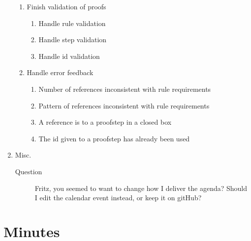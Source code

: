 \documentclass[a4paper]{article}
\begin{document}
\begin{enumerate}
\begin{enumerate}[\HollowBox]
      \item Finish validation of proofs
        \begin{enumerate}[\HollowBox]
          \item Handle rule validation
          \item Handle step validation
          \item Handle id validation
        \end{enumerate}
      \item Handle error feedback
        \begin{enumerate}[\HollowBox]
          \item Number of references inconsistent with rule requirements
          \item Pattern of references inconsistent with rule requirements
          \item A reference is to a proofstep in a closed box
          \item The id given to a proofstep has already been used
        \end{enumerate}
    \end{enumerate}
  \item Misc.
    \begin{description}
      \item[Question] Fritz, you seemed to want to change how I deliver the
      agenda?
      Should I edit the calendar event instead, or keep it on gitHub?
    \end{description}
\end{enumerate}

\newpage
\section{Minutes}
\end{document}
